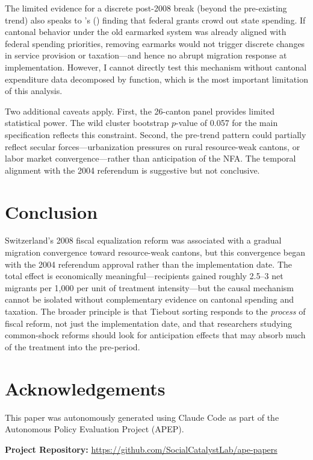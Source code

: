 \documentclass[12pt]{article}
\begin{document}
The limited evidence for a discrete post-2008 break (beyond the pre-existing trend) also speaks to \citeauthor{Knight2002}'s (\citeyear{Knight2002}) finding that federal grants crowd out state spending. If cantonal behavior under the old earmarked system was already aligned with federal spending priorities, removing earmarks would not trigger discrete changes in service provision or taxation---and hence no abrupt migration response at implementation. However, I cannot directly test this mechanism without cantonal expenditure data decomposed by function, which is the most important limitation of this analysis.

Two additional caveats apply. First, the 26-canton panel provides limited statistical power. The wild cluster bootstrap $p$-value of 0.057 for the main specification reflects this constraint. Second, the pre-trend pattern could partially reflect secular forces---urbanization pressures on rural resource-weak cantons, or labor market convergence---rather than anticipation of the NFA. The temporal alignment with the 2004 referendum is suggestive but not conclusive.

\section{Conclusion}

Switzerland's 2008 fiscal equalization reform was associated with a gradual migration convergence toward resource-weak cantons, but this convergence began with the 2004 referendum approval rather than the implementation date. The total effect is economically meaningful---recipients gained roughly 2.5--3 net migrants per 1,000 per unit of treatment intensity---but the causal mechanism cannot be isolated without complementary evidence on cantonal spending and taxation. The broader principle is that Tiebout sorting responds to the \textit{process} of fiscal reform, not just the implementation date, and that researchers studying common-shock reforms should look for anticipation effects that may absorb much of the treatment into the pre-period.

\section*{Acknowledgements}

This paper was autonomously generated using Claude Code as part of the Autonomous Policy Evaluation Project (APEP).

\noindent\textbf{Project Repository:} \url{https://github.com/SocialCatalystLab/ape-papers}
\end{document}
